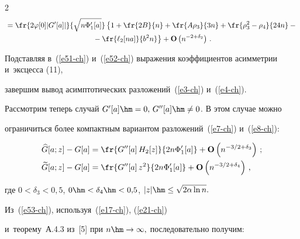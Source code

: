 \begin{multicols}{2}
\begin{multline}
{} =\fr{2\varphi[0]|G'[a]|}{\sqrt{n\Phi'_1[a]}}


  \left\{1+\fr{2B}{n}+\fr{A\rho_3}{3n} +\fr{\rho_3^2-\rho_4}{24n}


  -{}\right.\\


\left.  {}-\fr{\ell_2[na]}{b^2 n} \right\}+\mathbf{O}\left(n^{-2+\delta_2}\right)\,.


 \label{e52-ch}


 \end{multline}








 Подставляя в~(\ref{e51-ch}) и~(\ref{e52-ch}) выражения коэффициентов асимметрии и~эксцесса (11),


 завершим вывод асимптотических разложений~(\ref{e3-ch}) и~(\ref{e4-ch}).





 Рассмотрим теперь случай $G'[a]\hm=0,\,G''[a]\hm\neq 0$. В этом случае можно


 ограничиться более компактным вариантом разложений~(\ref{e7-ch}) и~(\ref{e8-ch}):


   \begin{align}


 \widehat{G}[a;z]-G[a]&=\fr{ G''[a]\, H_2[z]}{2n\Phi'_1[a]}


  + \mathbf{O}\left( {n^{- 3/2+\delta_3} } \right)\,;


\label{e53-ch}


 \\ 


 \widetilde{G}[a;z]-G[a]&=  \fr{G''[a]\, z^2 }{2n\Phi'_1[a] }


  + \mathbf{O}\left( {n^{- 3/2+\delta_4} } \right)\,,


 \label{e54-ch}


 \end{align}


 где $0<\delta_3<0{,}5$, $0\hm<\delta_4\hm<0{,}5$, $|z|\hm\le \sqrt{2\alpha\ln n}.$





 Из~(\ref{e53-ch}), используя~(\ref{e17-ch}), (\ref{e21-ch}) 


 и~теорему~А.4.3 из~[5] при $n\hm\to\infty,$  последовательно получим:


 \begin{multline*}



\end{multline*}
\end{multicols}
